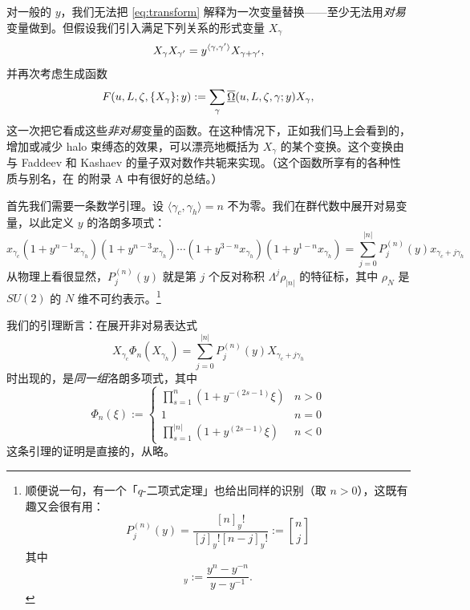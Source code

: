 对一般的 $y$，我们无法把 \eqref{eq:transform} 解释为一次变量替换——至少无法用\emph{对易}变量做到。但假设我们引入满足下列关系的形式变量 $X_\gamma$
\begin{equation}\label{eq:Heis-Alg}
X_\gamma X_{\gamma'} = y^{\langle \gamma, \gamma' \rangle} X_{\gamma +
\gamma'},
\end{equation}
并再次考虑生成函数
\begin{equation}\label{eq:form-gen}
F(u,L,\zeta,\{X_\gamma\};y) := \sum_{\gamma} \overline{\underline{\Omega}}(u, L, \zeta,
\gamma;y) X_\gamma,
\end{equation}
这一次把它看成这些\emph{非对易}变量的函数。在这种情况下，正如我们马上会看到的，增加或减少 halo 束缚态的效果，可以漂亮地概括为 $X_\gamma$ 的某个变换。这个变换由与 Faddeev 和 Kashaev \cite{Faddeev:1993rs} 的量子双对数作共轭来实现。（这个函数所享有的各种性质与别名，在 \cite{Teschner:2005bz} 的附录 A 中有很好的总结。）

首先我们需要一条数学引理。设 $\langle \gamma_c, \gamma_h \rangle = n$ 不为零。我们在群代数中展开对易变量，以此定义 $y$ 的洛朗多项式：
\begin{equation}
x_{\gamma_c} (1 + y^{n-1} x_{\gamma_h})(1 + y^{n-3}
x_{\gamma_h})\cdots (1 + y^{3-n} x_{\gamma_h})(1 + y^{1-n}
x_{\gamma_h}) = \sum_{j=0}^{\vert n\vert}  P^{(n)}_j(y) x_{\gamma_c
+ j \gamma_h}
\end{equation}
从物理上看很显然，$P^{(n)}_j(y)$ 就是第 $j$ 个反对称积 $\Lambda^j \rho_{\vert n \vert }$ 的特征标，其中 $\rho_{N}$ 是 $SU(2)$ 的 $N$ 维不可约表示。\footnote{顺便说一句，有一个「$q$-二项式定理」也给出同样的识别（取 $n>0$），这既有趣又会很有用：
\begin{equation}
P^{(n)}_j(y) = \frac{ [n]_y ! }{ [j]_y ! [n-j]_y !}:=\genfrac{[}{]}{0pt}{}{n}{j}
\end{equation}
其中
\begin{equation}
[n]_y := \frac{y^{n} - y^{-n}}{y - y^{-1}} .
\end{equation}
}

我们的引理断言：在展开非对易表达式
\begin{equation}
X_{\gamma_c} \Phi_n( X_{\gamma_h}) = \sum_{j=0}^{\vert n \vert}
P^{(n)}_j(y) X_{\gamma_c + j \gamma_h}
\end{equation}
时出现的，是\emph{同一组}洛朗多项式，其中
\begin{equation}
\Phi_n(\xi) := \begin{cases}  \prod_{s=1}^{n} (1 + y^{-(2s-1)} \xi )
& n >0 \\
 1 & n=0 \\
 \prod_{s=1}^{\vert n\vert } (1 + y^{(2s-1)} \xi ) & n< 0
 \end{cases}
\end{equation}
这条引理的证明是直接的，从略。

